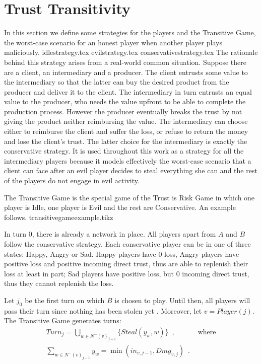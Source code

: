 \section{Trust Transitivity}
  In this section we define some strategies for the players and the Transitive Game, the worst-case scenario for an honest
  player when another player plays maliciously.
  {idlestrategy.tex}
  {evilstrategy.tex}
  {conservativestrategy.tex}
  The rationale behind this strategy arises from a real-world common situation. Suppose there are a client, an
  intermediary and a producer. The client entrusts some value to the intermediary so that the latter can buy the desired
  product from the producer and deliver it to the client. The intermediary in turn entrusts an equal value to the
  producer, who needs the value upfront to be able to complete the production process. However the producer eventually
  breaks the trust by not giving the product neither reimbursing the value. The intermediary can choose either to reimburse
  the client and suffer the loss, or refuse to return the money and lose the client's trust. The latter choice for the
  intermediary is exactly the conservative strategy. It is used throughout this work as a strategy for all the intermediary
  players because it models effectively the worst-case scenario that a client can face after an evil player decides to steal
  everything she can and the rest of the players do not engage in evil activity.

  The Transitive Game is the special game of the Trust is Risk Game in which one player is Idle, one player is Evil and the
  rest are Conservative. An example follows.
  {transitivegameexample.tikz}

  \noindent In turn 0, there is already a network in place. All players apart from $A$ and $B$ follow the conservative
  strategy. Each conservative player can be in one of three states: Happy, Angry or Sad. Happy players have 0 loss, Angry
  players have positive loss and positive incoming direct trust, thus are able to replenish their loss at least in part; Sad
  players have positive loss, but 0 incoming direct trust, thus they cannot replenish the loss.

  Let $j_0$ be the first turn on which $B$ is chosen to play. Until then, all players will pass their turn since nothing has
  been stolen yet \cite{trustisrisk}. Moreover, let $v = Player(j)$. The Transitive Game generates turns:
  \begin{align}
     Turn_j = \bigcup\limits_{w \in N^{-}\left(v\right)_{j-1}}\{Steal\left(y_w,w\right)\} \enspace, & \mbox{ where} \\
     \sum\limits_{w \in N^{-}\left(v\right)_{j-1}}y_w = \min\left(in_{v, j-1}, Dmg_{v, j}\right) \enspace. &
  \end{align}

